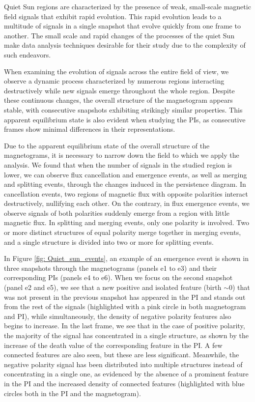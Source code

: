 Quiet Sun regions are characterized by the presence of weak, small-scale magnetic field signals that exhibit rapid evolution. This rapid evolution leads to a multitude of signals in a single snapshot that evolve quickly from one frame to another. The small scale and rapid changes of the processes of the quiet Sun make data analysis techniques desirable for their study due to the complexity of such endeavors. 

When examining the evolution of signals across the entire field of view, we observe a dynamic process characterized by numerous regions interacting destructively while new signals emerge throughout the whole region. Despite these continuous changes, the overall structure of the magnetogram appears stable, with consecutive snapshots exhibiting strikingly similar properties. This apparent equilibrium state is also evident when studying the PIs, as consecutive frames show minimal differences in their representations.

Due to the apparent equilibrium state of the overall structure of the magnetograms, it is necessary to narrow down the field to which we apply the analysis. We found that when the number of signals in the studied region is lower, we can observe flux cancellation and emergence events, as well as merging and splitting events, through the changes induced in the persistence diagram. In cancellation events, two regions of magnetic flux with opposite polarities interact destructively, nullifying each other. On the contrary, in flux emergence events, we observe signals of both polarities suddenly emerge from a region with little magnetic flux. In splitting and merging events, only one polarity is involved. Two or more distinct structures of equal polarity merge together in merging events, and a single structure is divided into two or more for splitting events.

In Figure \ref{fig: Quiet_sun_events}, an example of an emergence event is shown in three snapshots through the magnetograms (panels e1 to e3) and their corresponding PIs (panels e4 to e6). When we focus on the second snapshot (panel e2 and e5), we see that a new positive and isolated feature (birth $\sim 0$) that was not present in the previous snapshot has appeared in the PI and stands out from the rest of the signals (highlighted with a pink circle in both magnetogram and PI), while simultaneously, the density of negative polarity features also begins to increase. In the last frame, we see that in the case of positive polarity, the majority of the signal has concentrated in a single structure, as shown by the increase of the death value of the corresponding feature in the PI. A few connected features are also seen, but these are less significant. Meanwhile, the negative polarity signal has been distributed into multiple structures instead of concentrating in a single one, as evidenced by the absence of a prominent feature in the PI and the increased density of connected features (highlighted with blue circles both in the PI and the magnetogram).


